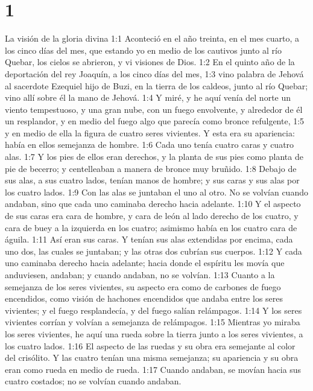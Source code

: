
\chapter{1}

La visión de la gloria divina  
1:1 Aconteció en el año treinta, en el mes cuarto, a los cinco días del mes, que estando yo en medio de los cautivos junto al río Quebar, los cielos se abrieron, y vi visiones de Dios.  
1:2 En el quinto año de la deportación del rey Joaquín, a los cinco días del mes,  
1:3 vino palabra de Jehová al sacerdote Ezequiel hijo de Buzi, en la tierra de los caldeos, junto al río Quebar; vino allí sobre él la mano de Jehová.  
1:4 Y miré, y he aquí venía del norte un viento tempestuoso, y una gran nube, con un fuego envolvente, y alrededor de él un resplandor, y en medio del fuego algo que parecía como bronce refulgente,  
1:5 y en medio de ella la figura de cuatro seres vivientes. Y esta era su apariencia: había en ellos semejanza de hombre.  
1:6 Cada uno tenía cuatro caras y cuatro alas.  
1:7 Y los pies de ellos eran derechos, y la planta de sus pies como planta de pie de becerro; y centelleaban a manera de bronce muy bruñido.  
1:8 Debajo de sus alas, a sus cuatro lados, tenían manos de hombre; y sus caras y sus alas por los cuatro lados.  
1:9 Con las alas se juntaban el uno al otro. No se volvían cuando andaban, sino que cada uno caminaba derecho hacia adelante.  
1:10 Y el aspecto de sus caras era cara de hombre, y cara de león al lado derecho de los cuatro, y cara de buey a la izquierda en los cuatro; asimismo había en los cuatro cara de águila. 
1:11 Así eran sus caras. Y tenían sus alas extendidas por encima, cada uno dos, las cuales se juntaban; y las otras dos cubrían sus cuerpos.  
1:12 Y cada uno caminaba derecho hacia adelante; hacia donde el espíritu les movía que anduviesen, andaban; y cuando andaban, no se volvían.  
1:13 Cuanto a la semejanza de los seres vivientes, su aspecto era como de carbones de fuego encendidos, como visión de hachones encendidos que andaba entre los seres vivientes; y el fuego resplandecía, y del fuego salían relámpagos.  
1:14 Y los seres vivientes corrían y volvían a semejanza de relámpagos.  
1:15 Mientras yo miraba los seres vivientes, he aquí una rueda sobre la tierra junto a los seres vivientes, a los cuatro lados.  
1:16 El aspecto de las ruedas y su obra era semejante al color del crisólito. Y las cuatro tenían una misma semejanza; su apariencia y su obra eran como rueda en medio de rueda.  
1:17 Cuando andaban, se movían hacia sus cuatro costados; no se volvían cuando andaban.  
